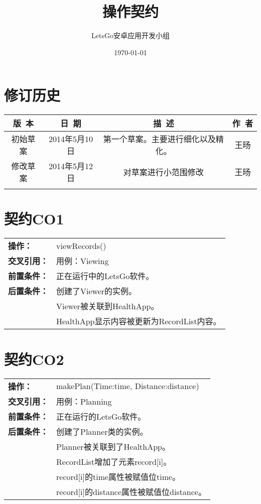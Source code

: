 \documentclass [a4paper,11pt]{article}
\title{操作契约}
\date{\today}
\author{LetsGo安卓应用开发小组}
\begin{document}
	
\maketitle
\section*{修订历史}

\begin{table}[!hbp]
\centering

\begin{tabular*}{\textwidth}{c|c|c|c}
\hline
\rule{0pt}{0.8cm}
版~本 & 日~期 & 描~述 & 作~者\\
\hline
\rule{0pt}{0.6cm}
初始草案 & 2014年5月10日 & 第一个草案。主要进行细化以及精化。 & 王旸\\
\hline
\rule{0pt}{0.6cm}
修改草案 & 2014年5月12日 & 对草案进行小范围修改 & 王旸\\ 
\hline
\rule{0pt}{0.6cm}
 &  &  & \\
\hline
\end{tabular*}
\end{table}


\begin{table}[!hbp]
\section*{契约CO1}
\centering
\begin{tabular*}{\textwidth}{p{}p{}}
\textbf{操作：} & viewRecords()\\
\textbf{交叉引用：} & 用例：Viewing\\
\textbf{前置条件：} & 正在运行中的LetsGo软件。\\
\textbf{后置条件：} & 创建了Viewer的实例。\\
				  & Viewer被关联到HealthApp。\\
				  & HealthApp显示内容被更新为RecordList内容。\\
\end{tabular*}
\end{table}

\begin{table}[!hbp]
\section*{契约CO2}
\centering
\begin{tabular*}{\textwidth}{p{}p{}}
\textbf{操作：} & makePlan(Time:time, Distance:distance)\\
\textbf{交叉引用：} & 用例：Planning\\
\textbf{前置条件：} & 正在运行的LetsGo软件。\\
\textbf{后置条件：} & 创建了Planner类的实例。\\
				  & Planner被关联到了HealthApp。\\
				  & RecordList增加了元素record[i]。\\
	&record[i]的time属性被赋值位time。\\
	&record[i]的distance属性被赋值位distance。\\
\end{tabular*}
\end{table}
\end{document}
